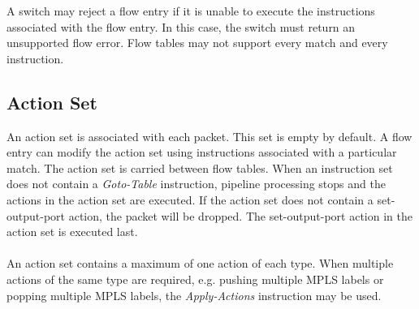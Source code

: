 \documentclass[10pt]{article}
\begin{document}
A switch may reject a flow entry if it is unable to execute the instructions associated with the flow entry. In this case, the switch must return an unsupported flow error.  Flow tables may not support every match and every instruction.

\subsection{Action Set}
\label{ft:actionset}
An action set is associated with each packet. This set is empty by default. A flow entry can modify the action set using instructions associated with a particular match. The action set is carried between flow tables. When an instruction set does not contain a \textit{Goto-Table} instruction, pipeline processing stops and the actions in the action set are executed. If the action set does not contain a set-output-port action, the packet will be dropped. The set-output-port action in the action set is executed last.
\\\\
An action set contains a maximum of one action of each type. When multiple actions of the same type are required, e.g. pushing multiple MPLS labels or popping multiple MPLS labels, the \emph{Apply-Actions} instruction may be used.
\end{document}

